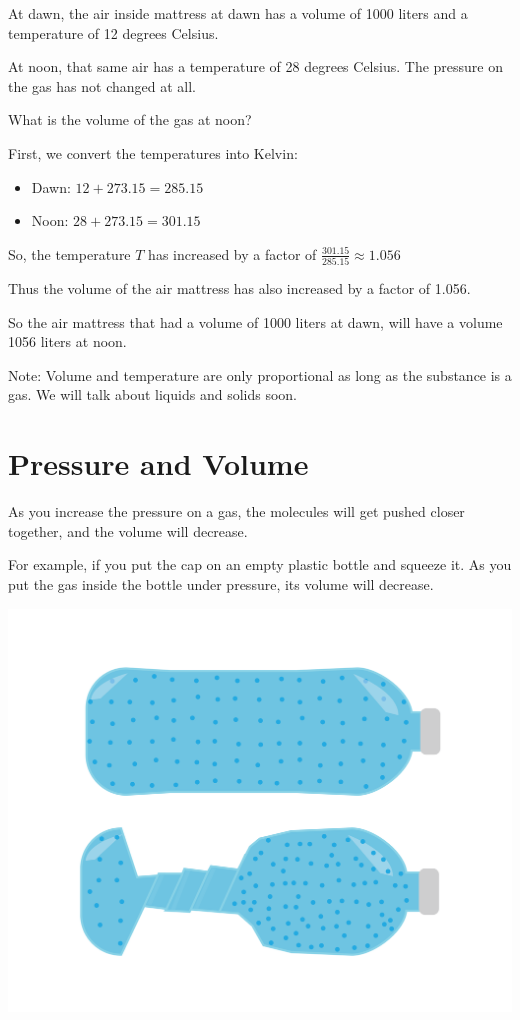 \begin{Exercise}[title={Temperature and Volume},  label=temp_vol]
  
At dawn, the air inside mattress at dawn has a volume of 1000 liters and a temperature of 12 degrees Celsius.

At noon,  that same air has a temperature of 28 degrees Celsius.  The pressure on the gas has not changed at all.

What is the volume of the gas at noon?

\end{Exercise}
\begin{Answer}[ref=temp_vol]

First, we convert the temperatures into Kelvin:  
\begin{itemize}
\item Dawn: $12 + 273.15 = 285.15$
\item Noon: $28 + 273.15 = 301.15$
\end{itemize}

So, the temperature $T$ has increased by a factor of $\frac{301.15}{285.15} \approx 1.056$

Thus the volume of the air mattress has also increased by a factor of 1.056.  

So the air mattress that had a volume of 1000 liters at dawn,  will have a volume 1056 liters at noon.

\end{Answer}

Note: Volume and temperature are only proportional as long as the substance is a gas.   We will talk about liquids and solids soon.

\section{Pressure and Volume}

As you increase the pressure on a gas,  the molecules will get pushed closer together,  and the volume will decrease.

For example,  if you put the cap on an empty plastic bottle and squeeze it.   As you put the gas inside the bottle under pressure,  its volume will decrease. 

\includegraphics[width=\textwidth]{waterBottle.png}


